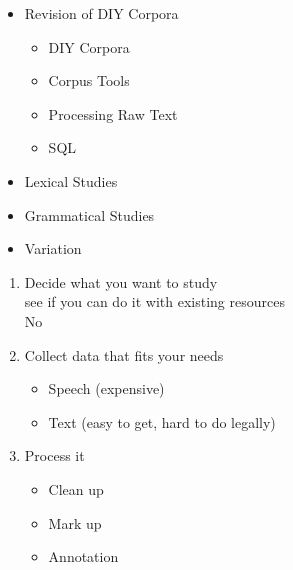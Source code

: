 \documentclass[a4paper,landscape,headrule,footrule,xetex]{foils}
\begin{document}

\maketitle



\begin{itemize} 
\item Revision  of DIY Corpora
  \begin{itemize} 
  \item DIY Corpora
  \item Corpus Tools
  \item Processing Raw Text
  \item SQL
  \end{itemize}
\item Lexical Studies
\item Grammatical Studies
\item Variation
\end{itemize}





\begin{enumerate}
\item Decide what you want to study
\\ see if you can do it with existing resources
\\ No \frownie
\item Collect data that fits your needs
  \begin{itemize}
  \item Speech (expensive)
  \item Text (easy to get, hard to do legally)
  \end{itemize}
\item Process it
  \begin{itemize}
  \item Clean up
  \item Mark up
  \item Annotation
  \end{itemize}
\end{enumerate}
\end{document}
